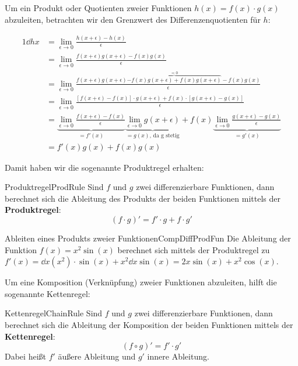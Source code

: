 Um ein Produkt oder Quotienten zweier Funktionen $h(x) = f(x) \cdot g(x)$ abzuleiten, betrachten wir den Grenzwert des Differenzenquotienten für $h$:

\begin{alignat*}{1}
    \dd{h}{x} &= \lim\limits_{\epsilon\to 0} \frac{h(x+\epsilon)-h(x)}{\epsilon} \\
              &= \lim\limits_{\epsilon \to 0} \frac{f(x+\epsilon)g(x+\epsilon)-f(x)g(x)}{\epsilon} \\
               &= \lim\limits_{\epsilon \to 0} \frac{f(x+\epsilon)g(x+\epsilon) \overbrace{-f(x)g(x+\epsilon) + f(x)g(x+\epsilon)}^{=0} - f(x)g(x)}{\epsilon} \\
               &= \lim\limits_{\epsilon \to 0} \frac{[f(x+\epsilon)-f(x)]\cdot g(x+\epsilon) + f(x) \cdot [g(x+\epsilon) - g(x)]}{\epsilon} \\
               &= \underbrace{\lim\limits_{\epsilon \to 0} \frac{f(x+\epsilon)-f(x)}{\epsilon}}_{=f'(x)} \underbrace{\lim\limits_{\epsilon\to 0} g(x+\epsilon)}_{=g(x)\text{, da g stetig}} + f(x) \underbrace{\lim\limits_{\epsilon \to 0} \frac{g(x+\epsilon)-g(x)}{\epsilon}}_{=g'(x)} \\
               &= f'(x)g(x) + f(x) g(x)
\end{alignat*}

Damit haben wir die sogenannte Produktregel erhalten:

\begin{statement}{Produktregel}{ProdRule}
    Sind $f$ und $g$ zwei differenzierbare Funktionen, dann berechnet sich die Ableitung des Produkts der beiden Funktionen mittels der \textbf{Produktregel}:
    $$
        (f \cdot g)' = f' \cdot g + f \cdot g'
    $$
\end{statement}

\begin{example}{Ableiten eines Produkts zweier Funktionen}{CompDiffProdFun}
    Die Ableitung der Funktion $f(x) = x^2 \sin(x)$ berechnet sich mittels der Produktregel zu $f'(x) = \dd{}{x} (x^2) \cdot  \sin(x) + x^2 \dd{}{x} \sin(x) = 2x\sin(x) + x^2\cos(x)$.
\end{example}

Um eine Komposition (Verknüpfung) zweier Funktionen abzuleiten, hilft die sogenannte Kettenregel:

\begin{statement}{Kettenregel}{ChainRule}
    Sind $f$ und $g$ zwei differenzierbare Funktionen, dann berechnet sich die Ableitung der Komposition der beiden Funktionen mittels der \textbf{Kettenregel}:
    $$
        (f \circ g)' = f' \cdot g'
    $$
    Dabei heißt $f'$ äußere Ableitung und $g'$ innere Ableitung.
\end{statement}

